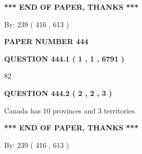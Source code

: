 \documentclass[12pt]{article}
\begin{document}
   
   
\vspace{1.0in} 
{\textbf{\large{ *** END OF PAPER, THANKS *** }}} 
   
   
\hspace{1.0in} By: 
 239 ( 416 ,  613 )
   
   
   
   
\newpage 
\setcounter{page}{ 
   444001 } 
   
   
   
   
 {\textbf{ \Large{ PAPER NUMBER  444  }}}
   
   
\vspace{0.2in}
   
   
   
   
   
   
 \vspace{0.2in}
 
 
 
 
   
   
  
\vspace{0.2in}
  
{\textbf{\Large{QUESTION
444.1 
 ( 1 , 1 , 6791 )
}}}
  
  
 
 
\noindent{}

82
 
 
  
\vspace{0.2in}
  
{\textbf{\Large{QUESTION
444.2 
 ( 2 , 2 , 3 )
}}}
  
  
 
 
\noindent{}
 
 
Canada has 10  provinces and 3 territories.
 
 
 
 
   
   
 \vspace{0.2in}
 
   
   
   
   
\vspace{1.0in} 
{\textbf{\large{ *** END OF PAPER, THANKS *** }}} 
   
   
\hspace{1.0in} By: 
 239 ( 416 ,  613 )
   
\end{document}
